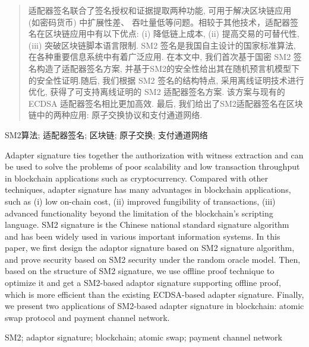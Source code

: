 \documentclass[review]{jcr}
\begin{document}
\begin{frontmatter}


  \begin{abstract}
适配器签名联合了签名授权和证据提取两种功能, 可用于解决区块链应用 (如密码货币) 中扩展性差、 吞吐量低等问题。相较于其他技术，适配器签名在区块链应用中有以下优点: (i) 降低链上成本, (ii) 提高交易的可替代性, (iii) 突破区块链脚本语言限制. SM2 签名是我国自主设计的国家标准算法, 在各种重要信息系统中有着广泛应用. 在本文中, 我们首次基于国密 SM2 签名构造了适配器签名方案, 并基于SM2的安全性给出其在随机预言机模型下的安全性证明.随后, 我们根据 SM2 签名的结构特点, 采用离线证明技术进行优化, 获得了可支持离线证明的 SM2 适配器签名方案. 该方案与现有的 ECDSA 适配器签名相比更加高效. 最后, 我们给出了SM2适配器签名在区块链中的两种应用: 原子交换协议和支付通道网络. 
  \end{abstract}

  \begin{keywords}
    SM2算法; 适配器签名; 区块链; 原子交换; 支付通道网络
  \end{keywords}

  \begin{eabstract}
   Adapter signature ties together the authorization with witness extraction and can be used to solve the problems of poor scalability and low transaction throughput in blockchain applications such as cryptocurrency. Compared with other techniques, adapter signature has many advantages in blockchain applications, such as (i) low on-chain cost, (ii) improved fungibility of transactions, (iii) advanced functionality beyond the limitation of the blockchain's scripting language. SM2 signature is the Chinese national standard signature algorithm and has been widely used in various important information systems. In this paper, we first design the adaptor signature based on SM2 signature algorithm, and prove security based on SM2 security under the random oracle model. Then, based on the structure of SM2 signature, we use offline proof technique to optimize it and get a SM2-based adaptor signature supporting offline proof, which is more efficient than the existing ECDSA-based adapter signature. Finally, we present two applications of SM2-based adapter signature in blockchain: atomic swap protocol and payment channel network.

  \end{eabstract}

  \begin{ekeywords}
    SM2; adaptor signature; blockchain; atomic swap; payment channel network
  \end{ekeywords}
\end{frontmatter}
\end{document}
